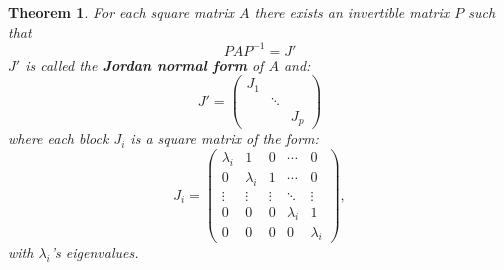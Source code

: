 \documentclass[a4paper,11pt]{report}
\newtheorem{theorem}{Theorem}[section]
\begin{document}
\begin{theorem}\label{jordanvrom}
  For each square matrix $A$ there exists an invertible matrix $P$ such that
    $$PAP^{-1} = J'$$
  $J'$ is called the \textbf{Jordan normal form}  of $A$ and:
  $$ J' = \begin{pmatrix}
  J_1 & & \\
  & \ddots & \\
  & & J_p
  \end{pmatrix}$$
  where each block $J_i$ is a square matrix of the form:
  $$J_i = \begin{pmatrix}
\lambda_i & 1       & 0       & \cdots  & 0 \\
0       & \lambda_i & 1       & \cdots  & 0 \\
\vdots  & \vdots  & \vdots& \ddots  & \vdots \\
0       & 0       & 0        & \lambda_i & 1       \\
0       & 0       & 0       & 0       & \lambda_i
  \end{pmatrix},$$
 with $\lambda_i$'s eigenvalues.

  \end{theorem}
\end{document}
